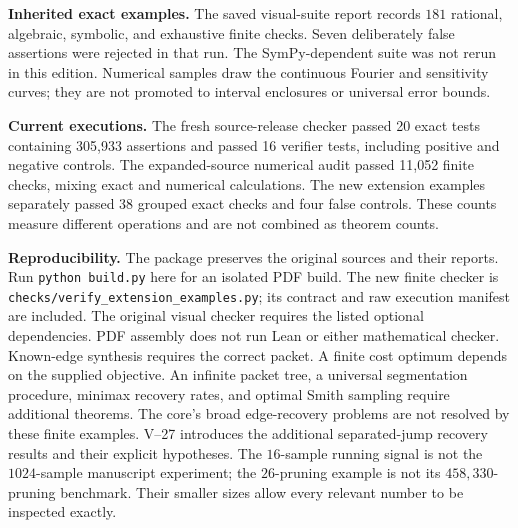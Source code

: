 \textbf{Inherited exact examples.} The saved visual-suite report records $181$ rational, algebraic, symbolic, and exhaustive finite checks. Seven deliberately false assertions were rejected in that run. The SymPy-dependent suite was not rerun in this edition. Numerical samples draw the continuous Fourier and sensitivity curves; they are not promoted to interval enclosures or universal error bounds.

\textbf{Current executions.} The fresh source-release checker passed 20 exact tests containing 305,933 assertions and passed 16 verifier tests, including positive and negative controls. The expanded-source numerical audit passed 11,052 finite checks, mixing exact and numerical calculations. The new extension examples separately passed 38 grouped exact checks and four false controls. These counts measure different operations and are not combined as theorem counts.\par
\textbf{Reproducibility.} The package preserves the original sources and their reports. Run \texttt{python build.py} here for an isolated PDF build. The new finite checker is \texttt{checks/verify\_extension\_examples.py}; its contract and raw execution manifest are included. The original visual checker requires the listed optional dependencies. PDF assembly does not run Lean or either mathematical checker.
Known-edge synthesis requires the correct packet. A finite cost optimum depends on the supplied objective. An infinite packet tree, a universal segmentation procedure, minimax recovery rates, and optimal Smith sampling require additional theorems. The core's broad edge-recovery problems are not resolved by these finite examples. V--27 introduces the additional separated-jump recovery results and their explicit hypotheses.
The $16$-sample running signal is not the $1024$-sample manuscript experiment; the $26$-pruning example is not its $458{,}330$-pruning benchmark. Their smaller sizes allow every relevant number to be inspected exactly.

